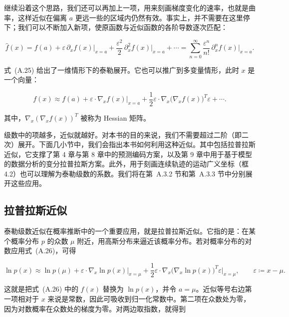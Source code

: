 继续沿着这个思路，我们还可以再加上一项，用来刻画梯度变化的速率，也就是曲率，这样近似在偏离 $a$ 更远一些的区域内仍然有效。事实上，并不需要在这里停下；我们可以不断加入新项，使原函数与近似函数的各阶导数逐次匹配：

\begin{equation}
\hat f(x)
= f(a)
+ \varepsilon \, \partial_x f(x)\big|_{x=a}
+ \frac{\varepsilon^2}{2} \, \partial_x^2 f(x)\big|_{x=a}
+ \cdots
= \sum_{n=0}^{\infty}
\frac{\varepsilon^n}{n!} \, \partial_x^n f(x)\big|_{x=a}.
\tag{A.25}
\end{equation}

式~(A.25) 给出了一维情形下的泰勒展开。它也可以推广到多变量情形，此时 $x$ 是一个向量：

\begin{equation}
f(x)
\approx
f(a)
+ \varepsilon \cdot \nabla_x f(x)\big|_{x=a}
+ \frac{1}{2}\varepsilon \cdot \nabla_x\bigl(\nabla_x f(x)\bigr)^T \varepsilon
+ \cdots.
\tag{A.26}
\end{equation}

其中，$\nabla_x(\nabla_x f(x))^T$ 被称为 Hessian 矩阵。

级数中的项越多，近似就越好。对本书的目的来说，我们不需要超过二阶（即二次）展开。下面几小节中，我们会指出本书如何利用这种近似。其中包括拉普拉斯近似，它支撑了第 4 章与第 8 章中的预测编码方案，以及第 9 章中用于基于模型的数据分析的变分拉普拉斯方案。此外，用于刻画连续轨迹的运动广义坐标（框 4.2）也可以理解为泰勒级数的系数。我们将在第~A.3.2 节和第~A.3.3 节中分别展开这些应用。

\subsection{拉普拉斯近似}

泰勒级数近似在概率推断中的一个重要应用，就是拉普拉斯近似。它指的是：在某个概率分布 $p$ 的众数 $\mu$ 附近，用高斯分布来逼近该概率分布。若对概率分布的对数应用式~(A.26)，可得

\begin{equation}
\ln p(x)
\approx
\ln p(\mu)
+ \varepsilon \cdot \nabla_x \ln p(x)\big|_{x=\mu}
+ \frac{1}{2}\varepsilon \cdot \nabla_x\bigl(\nabla_x \ln p(x)\bigr)^T \varepsilon \big|_{x=\mu},
\qquad
\varepsilon \coloneqq x-\mu.
\tag{A.27}
\end{equation}

这就是把式~(A.26) 中的 $f(x)$ 替换为 $\ln p(x)$，并令 $a=\mu$。近似等号右边第一项相对于 $x$ 来说是常数，因此可吸收到归一化常数中。第二项在众数处为零，因为对数概率在众数处的梯度为零。对两边取指数，就得到

